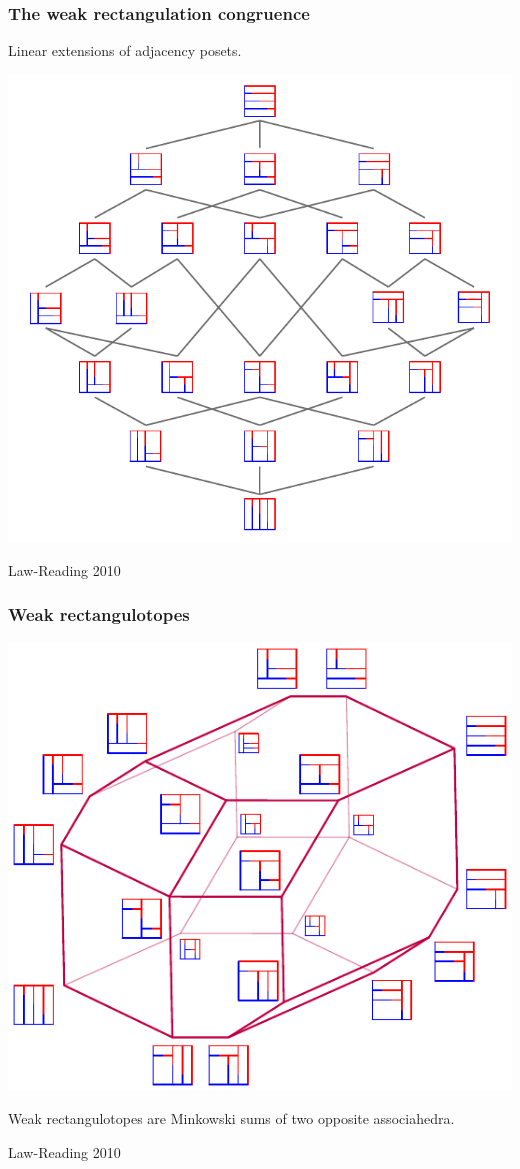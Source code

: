 \documentclass[11pt]{beamer}%
\newcommand{\green}{\color{darkgreen}}
\newcommand{\auth}[1]{{\green\hfill{\footnotesize #1}}}
\begin{document}
\begin{frame}
  \frametitle{The weak rectangulation congruence}
    Linear extensions of adjacency posets.
    \begin{center}
      \includegraphics[height=.7\textheight]{weakRectangulationLattice.pdf}
    \end{center}
    \auth{Law-Reading 2010} 
\end{frame}

\begin{frame}
  \frametitle{Weak rectangulotopes}
    \begin{center}
      \includegraphics[height=.6\textheight]{weakRectangulotopeLabeled.pdf}
    \end{center}
    \begin{theorem}
      Weak rectangulotopes are Minkowski sums of two opposite associahedra.
      \end{theorem}
    \auth{Law-Reading 2010}
\end{frame}
\end{document}
